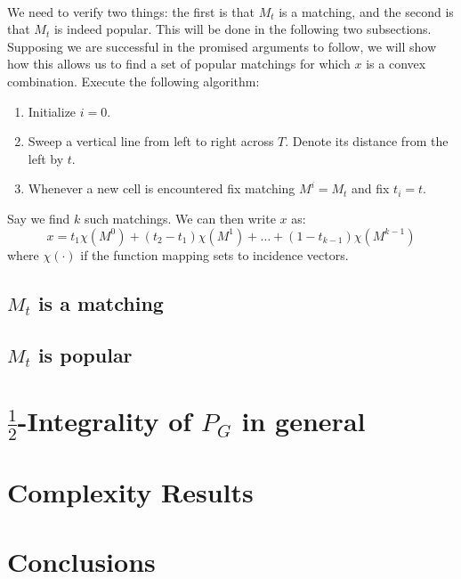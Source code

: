 \documentclass[letterpaper,12pt,oneside,onecolumn]{article}
\begin{document}
\paragraph{}
We need to verify two things: the first is that $M_t$ is a matching, and the second is that $M_t$ is indeed popular. This will be done in the following two subsections. Supposing we are successful in the promised arguments to follow, we will show how this allows us to find a set of popular matchings for which $x$ is a convex combination. Execute the following algorithm:
\begin{enumerate}
\item Initialize $i=0$.
\item Sweep a vertical line from left to right across $T$. Denote its distance from the left by $t$. 
\item Whenever a new cell is encountered fix matching $M^i = M_t$ and fix $t_i = t$. 
\end{enumerate}
Say we find $k$ such matchings. We can then write $x$ as:
$$x = t_1\chi(M^0) + (t_2 - t_1)\chi(M^1) + \dots + (1 - t_{k-1}) \chi(M^{k-1})$$
where $\chi(\cdot)$ if the function mapping sets to incidence vectors.

\subsection{$M_t$ is a matching}

\subsection{$M_t$ is popular}
\section{$\frac{1}{2}$-Integrality of $P_G$ in general}\label{sec:general}

\section{Complexity Results}\label{sec:complexity}

\section{Conclusions}



\end{document}
